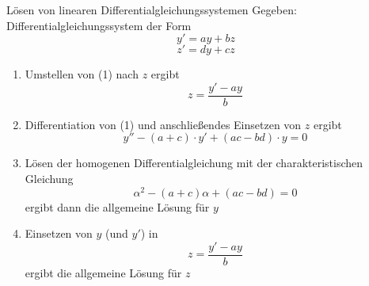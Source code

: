 \documentclass[german]{../spicker}
\begin{document}
\begin{algo}{Lösen von linearen Differentialgleichungssystemen}
    Gegeben: Differentialgleichungssystem der Form
    \begin{equation}
        y'  = ay + bz
    \end{equation}
    \begin{equation}
        z'  = dy + cz
    \end{equation}

    \begin{enumerate}
        \item Umstellen von (1) nach $z$ ergibt
              $$
                  z = \frac{y' - ay}{b}
              $$
        \item Differentiation von (1) und anschließendes Einsetzen von $z$ ergibt
              $$
                  y'' - (a + c) \cdot y' + (ac -bd) \cdot y = 0
              $$
        \item Lösen der homogenen Differentialgleichung mit der charakteristischen Gleichung
              $$
                  \alpha^2 - (a+c)\alpha + (ac-bd) = 0
              $$
              ergibt dann die allgemeine Lösung für $y$
        \item Einsetzen von $y$ (und $y'$) in
              $$
                  z =  \frac{y' - ay}{b}
              $$
              ergibt die allgemeine Lösung für $z$
    \end{enumerate}
\end{algo}
\end{document}
